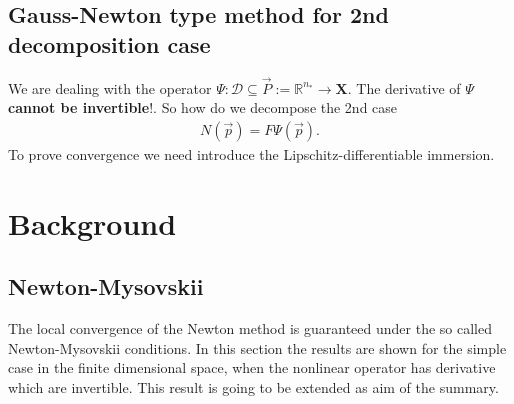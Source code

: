\subsection{Gauss-Newton type method for 2nd decomposition case}
We are dealing with the operator $\Psi:\mathcal{D} \subseteq \vec{P} :=
\mathbb{R}^{n_*} \to \mathbf{X}$. The derivative of $\Psi$ \textbf{cannot be
invertible}!. So how do we decompose the 2nd case
\begin{align}
    N(\vec{p}) = F\Psi(\vec{p}).
\end{align}
To prove convergence we need introduce the Lipschitz-differentiable immersion.
\section{Background}
\subsection{Newton-Mysovskii}
The local convergence of the Newton method is guaranteed under the so called Newton-Mysovskii
 conditions. In this section the results are shown for the simple case in the
 finite dimensional space, when the nonlinear operator has derivative which
 are invertible. This result is going to be extended as aim of the summary.

